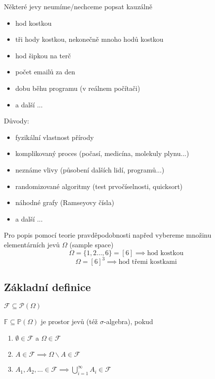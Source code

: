 \documentclass[../main.tex]{subfiles}
\begin{document}
\vspace{5mm}
\noindent 
Některé jevy neumíme/nechceme popsat kauzálně
\begin{itemize}
    \item hod kostkou
    \item tři hody kostkou, nekonečně mnoho hodů kostkou
    \item hod šipkou na terč
    \item počet emailů za den
    \item dobu běhu programu (v reálnem počítači)
    \item a další ...
\end{itemize}
Důvody:
\begin{itemize}
    \item fyzikální vlastnost přírody
    \item komplikovaný proces (počasí, medicína, molekuly plynu...)
    \item neznáme vlivy (působení dalších lidí, programů...)
    \item randomizované algoritmy (test prvočíselnosti, quicksort)
    \item náhodné grafy (Ramseyovy čísla)
    \item a další ...
\end{itemize}


\noindent
Pro popis pomocí teorie pravděpodobnosti napřed vybereme množinu elementárních jevů $\Omega$
(sample space)
\[\Omega = \{1,2\dots,6\} = [6] \implies \text{hod kostkou}\]
\[\Omega = [6]^3 \implies \text{hod třemi kostkami}\]

\subsection{Základní definice}
\begin{definition}
    $\mathcal{F} \subseteq \mathcal{P}(\Omega)$

    $\mathbb{F} \subseteq \mathbb{P}(\Omega)$ je prostor jevů (též $\sigma$-algebra), pokud
    \begin{enumerate}
        \item $\emptyset \in \mathcal{F}$ a $\Omega \in \mathcal{F}$
        \item $A \in \mathcal{F} \implies \Omega \backslash A \in \mathcal{F}$
        \item $A_1,A_2,... \in \mathcal{F} \implies \bigcup_{i=1}^{\infty}A_i \in \mathcal{F}$
    \end{enumerate}
\end{definition}
\end{document}
